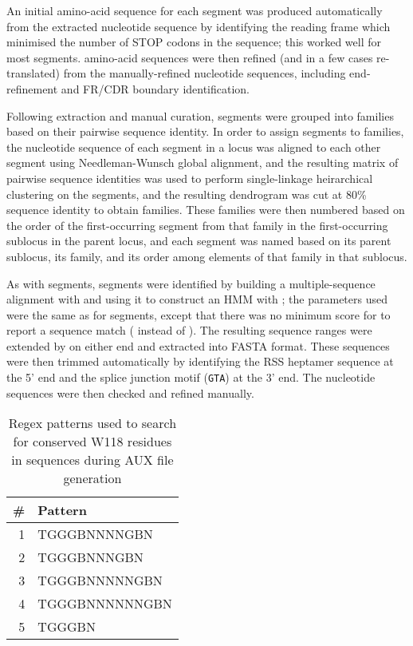 An initial amino-acid sequence for each \vh segment was produced automatically from the extracted nucleotide sequence by identifying the reading frame which minimised the number of STOP codons in the sequence; this worked well for most segments. \vh amino-acid sequences were then refined (and in a few cases re-translated) from the manually-refined nucleotide sequences, including end-refinement and FR/CDR boundary identification.

Following extraction and manual curation, \vh segments were grouped into families based on their pairwise sequence identity. In order to assign segments to families, the nucleotide sequence of each \vh segment in a locus was aligned to each other segment using Needleman-Wunsch global alignment, and the resulting matrix of pairwise sequence identities was used to perform single-linkage heirarchical clustering on the \vh segments, and the resulting dendrogram was cut at 80\% sequence identity to obtain \vh families. These families were then numbered based on the order of the first-occurring \vh segment from that family in the first-occurring sublocus in the parent locus, and each \vh segment was named based on its parent sublocus, its family, and its order among elements of that family in that sublocus.

\subsubsubsection{\jh}

As with \vh segments, \jh segments were identified by building a multiple-sequence alignment with  and using it to construct an HMM with ; the parameters used were the same as for \vh segments, except that there was no minimum score for  to report a sequence match ( instead of ). The resulting sequence ranges were extended by  on either end and extracted into FASTA format. These sequences were then trimmed automatically by identifying the RSS heptamer sequence at the 5' end and the splice junction motif (\texttt{GTA}) at the 3' end. The \jh nucleotide sequences were then checked and refined manually.

\begin{wraptable}{r}{5.5cm}
\caption{Regex patterns used to search for conserved W118 residues in \jh sequences during AUX file generation}\label{tab:jh-aux-patterns}
\begin{tabular}{r>{\ttseries}l}\toprule  
\# & Pattern \\\midrule
1 & TGGGBNNNNGBN\\
2 & TGGGBNNNGBN\\
3 & TGGGBNNNNNGBN\\
4 & TGGGBNNNNNNGBN\\
5 & TGGGBN\\\bottomrule
\end{tabular}
\end{wraptable}


